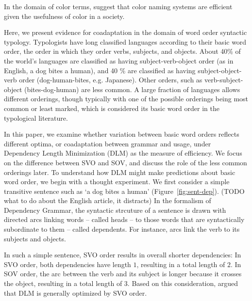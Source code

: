 \documentclass[11pt,a4paper]{article}
\newcommand\mhahn[1]{{\color{red}(#1)}}
\begin{document}
In the domain of color terms, \cite{gibson2017color} suggest that color naming systems are efficient given the usefulness of color in a society.

Here, we present evidence for coadaptation in the domain of word order syntactic typology.
Typologists have long classified languages according to their basic word order, the order in which they order verbs, subjects, and objects.
About 40\% of the world's languages are classified as having subject-verb-object order (as in English, a dog bites a human), and 40 \% are classified as having subject-object-verb order (dog-human-bites, e.g. Japanese).
Other orders, such as verb-subject-object (bites-dog-human) are less common.
A large fraction of languages allows different orderings, though typically with one of the possible orderings being most common or least marked, which is considered its basic word order in the typological literature.

In this paper, we examine whether variation between basic word orders reflects different optima, or coadaptation between grammar and usage, under Dependency Length Minimization (DLM) as the measure of efficiency.
We focus on the difference between SVO and SOV, and discuss the role of the less common orderings later.
To understand how DLM might make predictions about basic word order, we begin with a thought experiment.
We first consider a simple transitive sentence such as `a dog bites a human' (Figure~\ref{fig:sent-dep}). \mhahn{TODO what to do about the English article, it distracts}
In the formalism of Dependency Grammar, the syntactic strcuture of a sentence is drawn with directed arcs linking words -- called heads -- to those words that are syntactically subordinate to them -- called dependents.
For instance, arcs link the verb to its subjects and objects.

In such a simple sentence, SVO order results in overall shorter dependencies:
In SVO order, both dependencies have length $1$, resulting in a total length of $2$.
In SOV order, the arc between the verb and its subject is longer because it crosses the object, resulting in a total length of $3$.
Based on this consideration, \cite{ferrer-i-cancho-placement-2017} argued that DLM is generally optimized by SVO order.
\end{document}
